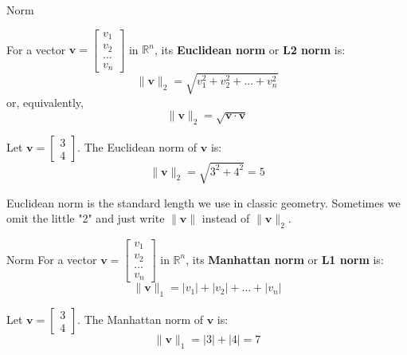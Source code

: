 \documentclass{beamer}
\newcommand{\vv}{\mathbf{v}}
\begin{document}
\begin{frame}{Norm}

    For a vector $\mathbf{v} = \begin{bmatrix} v_1 \\ v_2 \\ \dots \\ v_n \end{bmatrix}$ in $\mathbb{R}^n$, its \textbf{Euclidean norm} or \textbf{L2 norm} is:
    \[ \|\mathbf{v}\|_2 = \sqrt{v_1^2 +v_2^2+\dots+ v_n^2} \]
    or, equivalently,
    \[ \|\vv\|_2 = \sqrt{\vv \cdot \vv} \]

  \pause

  \begin{example}
    Let $\mathbf{v} = \begin{bmatrix} 3 \\ 4 \end{bmatrix}$. The Euclidean norm of $\mathbf{v}$ is:
    \[ \|\mathbf{v}\|_2 = \sqrt{3^2 + 4^2} = 5 \]
  \end{example}

\pause Euclidean norm is the standard length we use in classic geometry. Sometimes we omit the little "2" and just write $\|\mathbf{v}\|$ instead of $\|\mathbf{v}\|_2$.
\end{frame}

\begin{frame}{Norm}
    For a vector $\mathbf{v} = \begin{bmatrix} v_1 \\ v_2 \\ \dots \\ v_n \end{bmatrix}$ in $\mathbb{R}^n$, its \textbf{Manhattan norm} or \textbf{L1 norm} is:
    \[ \|\mathbf{v}\|_1 = |v_1| + |v_2| + \dots + |v_n| \]

  \pause

 \begin{example}
    Let $\mathbf{v} = \begin{bmatrix} 3 \\ 4 \end{bmatrix}$. The Manhattan norm of $\mathbf{v}$ is:
    \[ \|\mathbf{v}\|_1 = |3| + |4| = 7 \]
  \end{example}



\end{frame}
\end{document}
